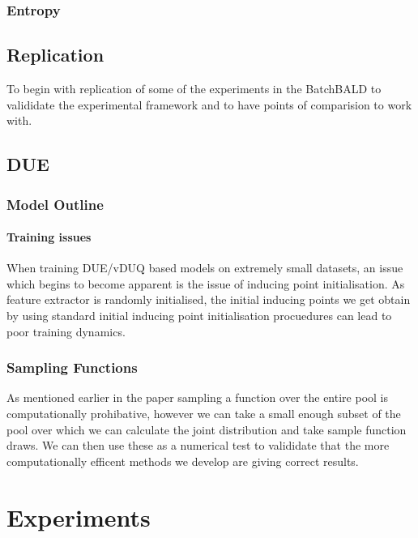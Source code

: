 \documentclass[12pt, a4paper]{report}
\theoremstyle{definition}
\begin{document}
\subsection{Entropy}



\section{Replication}

To begin with replication of some of the experiments in the BatchBALD to valididate the experimental framework and to have points of comparision to work with.




\section{DUE}

\subsection{Model Outline}


\subsubsection{Training issues}

When training DUE/vDUQ based models on extremely small datasets, an issue which begins to become apparent is the issue of inducing point initialisation. As feature extractor is randomly initialised, the initial inducing points we get obtain by using standard initial inducing point initialisation procuedures can lead to poor training dynamics.





\subsection{Sampling Functions}

As mentioned earlier in the paper sampling a function over the entire pool is computationally prohibative, however we can take a small enough subset of the pool over which we can calculate the joint distribution and take sample function draws.
We can then use these as a numerical test to valididate that the more computationally efficent methods we develop are giving correct results.


\chapter{Experiments}
\end{document}
